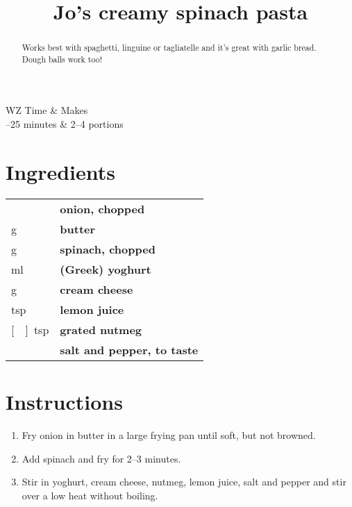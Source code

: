 \documentclass[main.tex]{subfiles}
\title{Jo's creamy spinach pasta}
\begin{document}
\maketitle%

\begin{margintable}
\begin{tabularx}{\textwidth}{WZ}
Time & Makes\\ 
--25 minutes & 2--4 portions\\
\end{tabularx}
\end{margintable}

\begin{abstract}
Works best with spaghetti, linguine or tagliatelle and it’s great with garlic bread. Dough balls work too!
\end{abstract}

\section{Ingredients}

\vspace*{-\baselineskip}
\begin{table}[ht]
	\begin{tabularx}{\textwidth}{>{\hsize=0.333\hsize}X>{\bf\hsize=1\hsize}X}
	\unit[1]{} & onion, chopped \\
	\unit[50]{g} & butter \\
	\unit[115]{g} & spinach, chopped\\
	\unit[150]{ml} & (Greek) yoghurt\\
	\unit[125]{g} & cream cheese \\
	\unit[1]{tsp} & lemon juice \\
	\unit[\nicefrac{1}{4}]{tsp} & grated nutmeg \\
    \unit[]{} & salt and pepper, to taste
	\end{tabularx}
\end{table}

\section{Instructions}

\begin{enumerate}	
	\item Fry onion in butter in a large frying pan until soft, but not browned.
	
	\item Add spinach and fry for 2--3 minutes.
	
	\item Stir in yoghurt, cream cheese, nutmeg, lemon juice, salt and pepper and stir over a low heat without boiling.
	
\end{enumerate}


\end{document}
